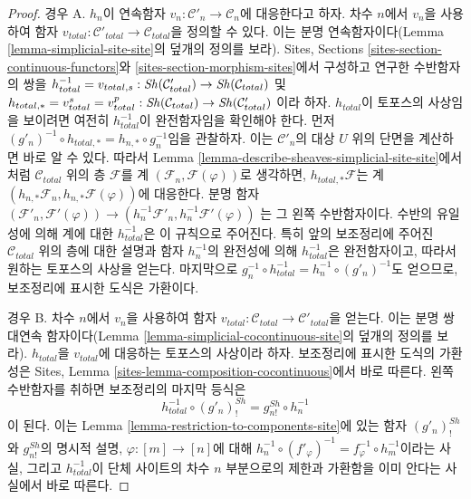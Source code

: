 \begin{proof}
경우 A. $h_n$이 연속함자
$v_n : \mathcal{C}'_n \to \mathcal{C}_n$에 대응한다고 하자.
차수 $n$에서 $v_n$을 사용하여 함자
$v_{total} : \mathcal{C}'_{total} \to \mathcal{C}_{total}$을 정의할 수 있다.
이는 분명 연속함자이다(Lemma \ref{lemma-simplicial-site-site}의
덮개의 정의를 보라). Sites, Sections
\ref{sites-section-continuous-functors}와
\ref{sites-section-morphism-sites}에서 구성하고 연구한 수반함자의 쌍을
$h_{total}^{-1} = v_{total, s} :
\mathop{\mathit{Sh}}\nolimits(\mathcal{C}'_{total}) \to \mathop{\mathit{Sh}}\nolimits(\mathcal{C}_{total})$ 및
$h_{total, *} = v_{total}^s = v_{total}^p :
\mathop{\mathit{Sh}}\nolimits(\mathcal{C}_{total}) \to \mathop{\mathit{Sh}}\nolimits(\mathcal{C}'_{total})$
이라 하자. $h_{total}$이 토포스의 사상임을 보이려면 여전히
$h_{total}^{-1}$이 완전함자임을 확인해야 한다. 먼저
$(g'_n)^{-1} \circ h_{total, *} = h_{n, *} \circ g_n^{-1}$임을 관찰하자.
이는 $\mathcal{C}'_n$의 대상 $U$ 위의 단면을 계산하면 바로 알 수 있다.
따라서 Lemma \ref{lemma-describe-sheaves-simplicial-site-site}에서처럼
$\mathcal{C}_{total}$ 위의 층 $\mathcal{F}$를 계
$(\mathcal{F}_n, \mathcal{F}(\varphi))$로 생각하면,
$h_{total, *}\mathcal{F}$는 계
$(h_{n, *}\mathcal{F}_n, h_{n, *}\mathcal{F}(\varphi))$에 대응한다.
분명 함자
$(\mathcal{F}'_n, \mathcal{F}'(\varphi)) \to
(h_n^{-1}\mathcal{F}'_n, h_n^{-1}\mathcal{F}'(\varphi))$
는 그 왼쪽 수반함자이다. 수반의 유일성에 의해 계에 대한
$h_{total}^{-1}$은 이 규칙으로 주어진다. 특히 앞의 보조정리에 주어진
$\mathcal{C}_{total}$ 위의 층에 대한 설명과 함자 $h_n^{-1}$의 완전성에 의해
$h_{total}^{-1}$은 완전함자이고, 따라서 원하는 토포스의 사상을 얻는다.
마지막으로 $g_n^{-1} \circ h_{total}^{-1} =
h_n^{-1} \circ (g'_n)^{-1}$도 얻으므로, 보조정리에 표시한 도식은 가환이다.

\medskip\noindent
경우 B. 차수 $n$에서 $v_n$을 사용하여 함자
$v_{total} : \mathcal{C}_{total} \to \mathcal{C}'_{total}$을 얻는다.
이는 분명 쌍대연속 함자이다(Lemma
\ref{lemma-simplicial-cocontinuous-site}의 덮개의 정의를 보라).
$h_{total}$을 $v_{total}$에 대응하는 토포스의 사상이라 하자.
보조정리에 표시한 도식의 가환성은 Sites, Lemma
\ref{sites-lemma-composition-cocontinuous}에서 바로 따른다.
왼쪽 수반함자를 취하면 보조정리의 마지막 등식은
$$
h_{total}^{-1} \circ (g'_n)^{Sh}_! = g^{Sh}_{n!} \circ h_n^{-1}
$$
이 된다. 이는 Lemma \ref{lemma-restriction-to-components-site}에 있는
함자 $(g'_n)^{Sh}_!$와 $g^{Sh}_{n!}$의 명시적 설명,
$\varphi : [m] \to [n]$에 대해
$h_n^{-1} \circ (f'_\varphi)^{-1} =
f_\varphi^{-1} \circ h_m^{-1}$이라는 사실, 그리고 $h_{total}^{-1}$이
단체 사이트의 차수 $n$ 부분으로의 제한과 가환함을 이미 안다는 사실에서
바로 따른다.
\end{proof}

